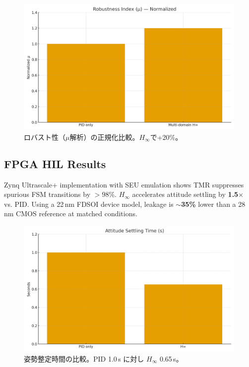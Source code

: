 \documentclass[conference]{IEEEtran}
\begin{document}
\begin{figure}[t]
  \centering
  \includegraphics[width=\linewidth]{figs/fig_mu_improvement.png}
  \caption{ロバスト性（$\mu$解析）の正規化比較。$H_\infty$で+20\%。}
  \label{fig:mu}
\end{figure}
\FloatBarrier

\subsection{FPGA HIL Results}
Zynq Ultrascale+ implementation with SEU emulation shows TMR suppresses spurious FSM
transitions by $>\!98\%$. $H_\infty$ accelerates attitude settling by \textbf{1.5$\times$}
vs. PID. Using a 22\,nm FDSOI device model, leakage is $\sim$\textbf{35\%} lower than
a 28\,nm CMOS reference at matched conditions.

\begin{figure}[t]
  \centering
  \includegraphics[width=\linewidth]{figs/fig_settling_time.png}
  \caption{姿勢整定時間の比較。PID 1.0\,s に対し $H_\infty$ 0.65\,s。}
  \label{fig:settle}
\end{figure}
\end{document}
